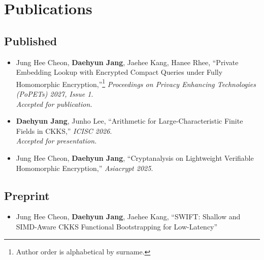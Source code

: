 \documentclass[11pt]{article}
\begin{document}
\section{Publications}

\subsection{Published}
\begin{itemize}
    \emergencystretch=2em
    \item Jung Hee Cheon, {\bf Daehyun Jang}, Jaehee Kang, Hanee Rhee, ``Private Embedding Lookup with Encrypted Compact Queries under Fully Homomorphic Encryption,''{\renewcommand{\thefootnote}{\ensuremath{\alpha}}\footnote{\label{fn:author-order}Author order is alphabetical by surname.}} \textit{Proceedings on Privacy Enhancing Technologies (PoPETs) 2027, Issue 1}.\\
    {\footnotesize\textit{Accepted for publication.}}
    \item {\bf Daehyun Jang}, Junho Lee, ``Arithmetic for Large-Characteristic Finite Fields in CKKS,'' \textit{ICISC 2026}.\\
    {\footnotesize\textit{Accepted for presentation.}}
    \item Jung Hee Cheon, {\bf Daehyun Jang}, ``Cryptanalysis on Lightweight Verifiable Homomorphic Encryption,'' \textit{Asiacrypt 2025}.
\end{itemize}

\subsection{Preprint}
    \begin{itemize}
        \emergencystretch=2em
        \item Jung Hee Cheon, {\bf Daehyun Jang}, Jaehee Kang, ``SWIFT: Shallow and SIMD-Aware CKKS Functional Bootstrapping for Low-Latency''
    \end{itemize}
\end{document}
